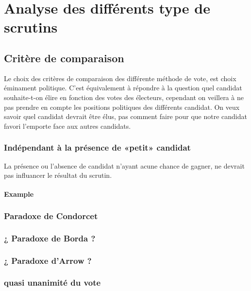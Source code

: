 \documentclass[../report]{subfiles}
\begin{document}
  \part{Analyse des différents type de scrutins}
  
  \chapter{Critère de comparaison}
  
  Le choix des critères de comparaison des différente méthode de vote, est choix 
  éminament politique.
  C'est équivalement à répondre à la question quel candidat souhaite-t-on élire en fonction
  des votes des électeurs, cependant on veillera à ne pas prendre en compte les positions 
  politiques des différents candidat.
  On veux savoir quel candidat devrait être élus, pas comment faire pour que notre candidat 
  favori l'emporte face aux autres candidats.
  
  \section{Indépendant à la présence de «petit» candidat}
  
  La présence ou l'absence de candidat n'ayant acune chance de gagner, ne devrait pas influancer
  le résultat du scrutin.
  
  \subsection{Example}
  \newcommand\scrutinname{« Vote 1 »}

  \section{Paradoxe de Condorcet}
  \section{¿ Paradoxe de Borda ?}
  \section{¿ Paradoxe d'Arrow ?}
  \section{quasi unanimité du vote}
  
\end{document}
